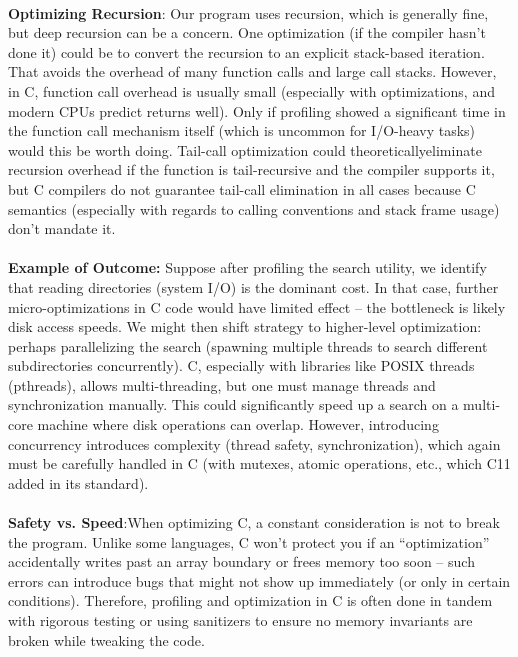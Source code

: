 \documentclass{article}
\begin{document}
\\
{\normalsize \textbf{Optimizing Recursion}}: {\normalsize Our program uses recursion, which is generally fine, but deep recursion can be a concern}{\normalsize . One optimization (if the compiler hasn’t done it) could be to convert the recursion to an explicit stack-based iteration. That avoids the overhead of many function calls and large call stacks. However, in C, function call overhead is usually small (espec}{\normalsize ially with optimizations, and modern CPUs predict returns well). Only if profiling showed a significant time in the function call mechanism itself (which is uncommon for I/O-heavy tasks) would this be worth doing. Tail-call optimization could theoretically}{\normalsize  eliminate recursion overhead if the function is tail-recursive and the compiler supports it, but C compilers do not guarantee tail-call elimination in all cases because C semantics (especially with regards to calling conventions and stack frame usage) don}{\normalsize ’t mandate it.}\\
\\
{\normalsize \textbf{Example of Outcome}}{\normalsize \textbf{:}} {\normalsize Suppose after profiling the search utility, we identify that reading directories (system I/O) is the dominant cost. In that case, further micro-optimizations in C code would have limited effect – the }{\normalsize bottleneck is likely disk access speeds. We might then shift strategy to higher-level optimization: perhaps parallelizing the search (spawning multiple threads to search different subdirectories concurrently). C, especially with libraries like POSIX thread}{\normalsize s (}{\normalsize pthreads}{\normalsize ), allows multi-threading, but one must manage threads and synchronization manually. This could significantly speed up a search on a multi-core machine where disk operations can overlap. However, introducing concurrency introduces }{\normalsize complexity (th}{\normalsize read safety, synchronization), which again must be carefully handled in C (with mutexes, atomic operations, etc., which C11 added in its standard).}\\
\\
{\normalsize \textbf{Safety vs. Speed}}{\normalsize :}{\normalsize  When optimizing C, a constant consideration is not to break the program. Unlike some }{\normalsize languages, C won’t protect you if an “optimization” accidentally writes past an array boundary or frees memory too soon – such errors can introduce bugs that might not show up immediately (or only in certain conditions). Therefore, profiling and optimizati}{\normalsize on in C is often done in tandem with rigorous testing or using sanitizers to ensure no memory invariants are broken while tweaking the code.}\\
\end{document}
